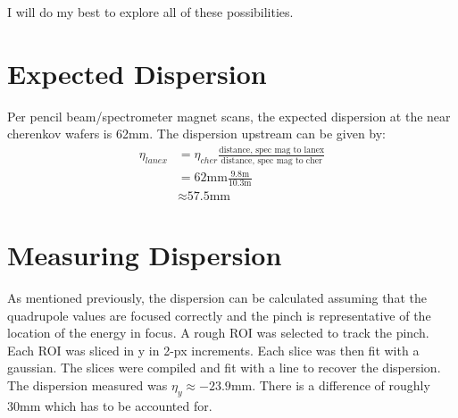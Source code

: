 \documentclass[aps,prl,twocolumn,groupedaddress]{revtex4}
\begin{document}
I will do my best to explore all of these possibilities.

\section{Expected Dispersion}

Per pencil beam/spectrometer magnet scans, the expected dispersion at the near cherenkov wafers is 62mm.  The dispersion upstream can be given by:
\begin{align}
	\eta_{lanex} &= \eta_{cher} \frac{\textrm{distance, spec mag to lanex}}{\textrm{distance, spec mag to cher}}\\
	&= \textrm{62mm} \frac{\textrm{9.8m}}{\textrm{10.3m}}\\
	&\approx \textrm{57.5mm}
	\label{}
\end{align}

\section{Measuring Dispersion}

As mentioned previously, the dispersion can be calculated assuming that the quadrupole values are focused correctly and the pinch is representative of the location of the energy in focus.  A rough ROI was selected to track the pinch.  Each ROI was sliced in y in 2-px increments.  Each slice was then fit with a gaussian.  The slices were compiled and fit with a line to recover the dispersion.  The dispersion measured was $\eta_y\approx-23.9$mm.  There is a difference of roughly 30mm which has to be accounted for.
\end{document}
